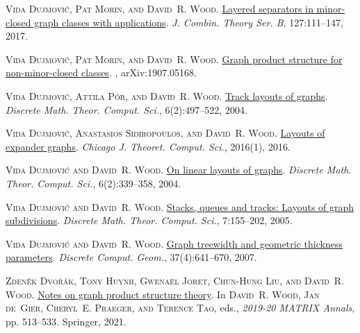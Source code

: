 \documentclass[kpfonts]{patmorin}
\begin{document}
	\textsc{Vida Dujmovi{\'c}, Pat Morin, and David~R. Wood}.
	\newblock \href{https://doi.org/10.1016/j.jctb.2017.05.006}{Layered separators
		in minor-closed graph classes with applications}.
	\newblock \emph{J. Combin. Theory Ser. B}, 127:111--147, 2017.
	
	\textsc{Vida Dujmovi{\'c}, Pat Morin, and David~R. Wood}.
	\newblock \href{http://arxiv.org/abs/1907.05168}{Graph product structure for
		non-minor-closed classes}.
	, arXiv:1907.05168.
	
	\textsc{Vida Dujmovi{\'c}, Attila P\'or, and David~R. Wood}.
	\newblock \href{http://dmtcs.episciences.org/315}{Track layouts of graphs}.
	\newblock \emph{Discrete Math. Theor. Comput. Sci.}, 6(2):497--522, 2004.
	
	\textsc{Vida Dujmovi{\'c}, Anastasios Sidiropoulos, and David~R. Wood}.
	\newblock \href{https://doi.org/10.4086/cjtcs.2016.001}{Layouts of expander
		graphs}.
	\newblock \emph{Chicago J. Theoret. Comput. Sci.}, 2016(1), 2016.
	
	\textsc{Vida Dujmovi{\'c} and David~R. Wood}.
	\newblock \href{http://dmtcs.episciences.org/317}{On linear layouts of graphs}.
	\newblock \emph{Discrete Math. Theor. Comput. Sci.}, 6(2):339--358, 2004.
	
	\textsc{Vida Dujmovi{\'c} and David~R. Wood}.
	\newblock \href{http://dmtcs.episciences.org/346}{Stacks, queues and tracks:
		Layouts of graph subdivisions}.
	\newblock \emph{Discrete Math. Theor. Comput. Sci.}, 7:155--202, 2005.
	
	\textsc{Vida Dujmovi{\'c} and David~R. Wood}.
	\newblock \href{https://doi.org/10.1007/s00454-007-1318-7}{Graph treewidth and
		geometric thickness parameters}.
	\newblock \emph{Discrete Comput. Geom.}, 37(4):641--670, 2007.
	
	\textsc{Zden{\v{e}}k Dvo{\v{r}}{\'a}k, Tony Huynh, Gwena\"el Joret, Chun-Hung
		Liu, and David~R. Wood}.
	\newblock \href{https://doi.org/10.1007/978-3-030-62497-2_32}{Notes on graph
		product structure theory}.
	\newblock In \textsc{David~R. Wood, Jan de~Gier, Cheryl~E. Praeger, and Terence
		Tao}, eds., \emph{2019-20 MATRIX Annals}, pp. 513--533. Springer, 2021.
	
\end{document}

